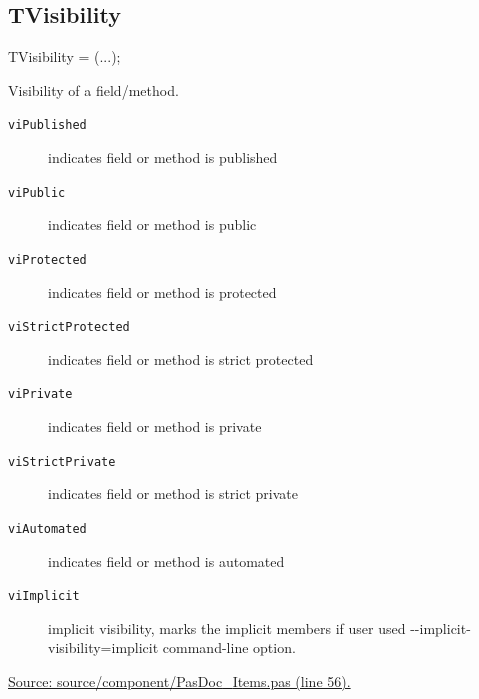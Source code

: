 \documentclass{report}
\newif\ifpdf
\begin{document}
\subsection*{TVisibility}
\fi
\label{PasDoc_Items-TVisibility}
\begin{list}{}{
\setlength{\itemindent}{0cm}
\setlength{\listparindent}{0cm}
\setlength{\leftmargin}{\evensidemargin}
\addtolength{\leftmargin}{\tmplength}
\settowidth{\labelsep}{X}
\addtolength{\leftmargin}{\labelsep}
\setlength{\labelwidth}{\tmplength}
}
\item[\textbf{Declaration}\hfill]
\ifpdf
\begin{flushleft}
\fi
\begin{ttfamily}
TVisibility = (...);\end{ttfamily}

\ifpdf
\end{flushleft}
\fi

\par
\item[\textbf{Description}]
Visibility of a field/method.\item[\textbf{Values}]
\begin{description}
\item[\texttt{viPublished}] \label{PasDoc_Items-viPublished}
\index{}
indicates field or method is published
\item[\texttt{viPublic}] \label{PasDoc_Items-viPublic}
\index{}
indicates field or method is public
\item[\texttt{viProtected}] \label{PasDoc_Items-viProtected}
\index{}
indicates field or method is protected
\item[\texttt{viStrictProtected}] \label{PasDoc_Items-viStrictProtected}
\index{}
indicates field or method is strict protected
\item[\texttt{viPrivate}] \label{PasDoc_Items-viPrivate}
\index{}
indicates field or method is private
\item[\texttt{viStrictPrivate}] \label{PasDoc_Items-viStrictPrivate}
\index{}
indicates field or method is strict private
\item[\texttt{viAutomated}] \label{PasDoc_Items-viAutomated}
\index{}
indicates field or method is automated
\item[\texttt{viImplicit}] \label{PasDoc_Items-viImplicit}
\index{}
implicit visibility, marks the implicit members if user used {-}{-}implicit{-}visibility=implicit command{-}line option.
\end{description}
\par
\href{https://github.com/pasdoc/pasdoc/blob/master/source/component/PasDoc_Items.pas#L56}{Source: source/component/PasDoc{\_}Items.pas (line 56).}

\end{list}
\ifpdf
\end{document}
